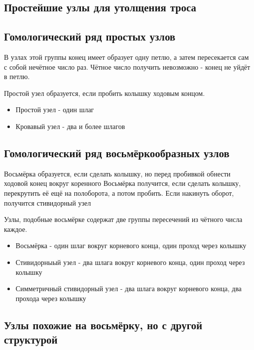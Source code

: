 \subsection{Простейшие узлы для утолщения троса}

\subsection{Гомологический ряд простых узлов}
В узлах этой группы конец имеет образует одну петлю, а затем пересекается сам с собой нечётное число раз.
Чётное число получить невозможно - конец не уйдёт в петлю.

Простой узел образуется, если пробить колышку ходовым концом.
\begin{itemize}
\item Простой узел - один шлаг 

\item Кровавый узел - два и более шлагов 

\end{itemize}

\subsection{Гомологический ряд восьмёркообразных узлов}

Восьмёрка образуется, если сделать колышку, но перед пробивкой обнести ходовой конец вокруг коренного
Восьмёрка получится, если сделать колышку, перекрутить её ещё на полоборота, а потом пробить.
Если накинуть оборот, получится стивидорный узел

Узлы, подобные восьмёрке содержат две группы пересечений из чётного числа каждое.

\begin{itemize}
\item Восьмёрка - один шлаг вокруг корневого конца, один проход через колышку

\item Стивидорныый узел - два шлага вокруг корневого конца, один проход через колышку

\item Симметричный стивидорный узел - два шлага вокруг корневого конца, два прохода через колышку
\end{itemize}

\subsection{Узлы похожие на восьмёрку, но с другой структурой}

